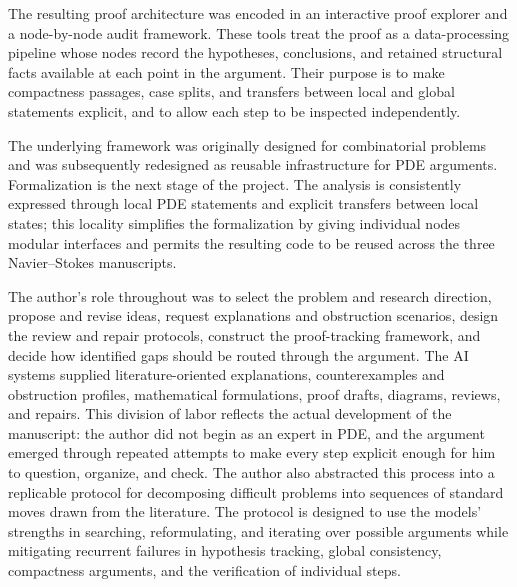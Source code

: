 \documentclass[11pt]{amsart}
\numberwithin{equation}{section}
\theoremstyle{plain}
\theoremstyle{definition}
\theoremstyle{remark}
\begin{document}
The resulting proof architecture was encoded in an interactive proof explorer
and a node-by-node audit framework.  These tools treat the proof as a
data-processing pipeline whose nodes record the hypotheses, conclusions, and
retained structural facts available at each point in the argument.  Their
purpose is to make compactness passages, case splits, and transfers between
local and global statements explicit, and to allow each step to be inspected
independently.

The underlying framework was originally designed for combinatorial problems
and was subsequently redesigned as reusable infrastructure for PDE arguments.
Formalization is the next stage of the project.  The analysis is consistently
expressed through local PDE statements and explicit transfers between local
states; this locality simplifies the formalization by giving individual nodes
modular interfaces and permits the resulting code to be reused across the
three Navier--Stokes manuscripts.

The author's role throughout was to select the problem and research direction,
propose and revise ideas, request explanations and obstruction scenarios,
design the review and repair protocols, construct the proof-tracking framework,
and decide how identified gaps should be routed through the argument.  The AI
systems supplied literature-oriented explanations, counterexamples and
obstruction profiles, mathematical formulations, proof drafts, diagrams,
reviews, and repairs.  This division of labor reflects the actual development
of the manuscript: the author did not begin as an expert in PDE, and the
argument emerged through repeated attempts to make every step explicit enough
for him to question, organize, and check.  The author also abstracted this
process into a replicable protocol for decomposing difficult problems into
sequences of standard moves drawn from the literature.  The protocol is
designed to use the models' strengths in searching, reformulating, and
iterating over possible arguments while mitigating recurrent failures in
hypothesis tracking, global consistency, compactness arguments, and the
verification of individual steps.
\end{document}
